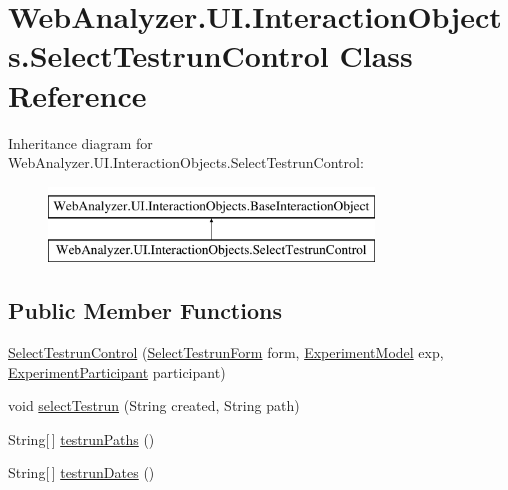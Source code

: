 \hypertarget{class_web_analyzer_1_1_u_i_1_1_interaction_objects_1_1_select_testrun_control}{}\section{Web\+Analyzer.\+U\+I.\+Interaction\+Objects.\+Select\+Testrun\+Control Class Reference}
\label{class_web_analyzer_1_1_u_i_1_1_interaction_objects_1_1_select_testrun_control}
Inheritance diagram for Web\+Analyzer.\+U\+I.\+Interaction\+Objects.\+Select\+Testrun\+Control\+:\begin{figure}[H]
\begin{center}
\leavevmode
\includegraphics[height=2.000000cm]{class_web_analyzer_1_1_u_i_1_1_interaction_objects_1_1_select_testrun_control}
\end{center}
\end{figure}
\subsection*{Public Member Functions}
\begin{DoxyCompactItemize}
\item 
\hyperlink{class_web_analyzer_1_1_u_i_1_1_interaction_objects_1_1_select_testrun_control_a4f0dbab279a50962ffdcc3b473e6167e}{Select\+Testrun\+Control} (\hyperlink{class_web_analyzer_1_1_u_i_1_1_select_testrun_form}{Select\+Testrun\+Form} form, \hyperlink{class_web_analyzer_1_1_models_1_1_base_1_1_experiment_model}{Experiment\+Model} exp, \hyperlink{class_web_analyzer_1_1_models_1_1_base_1_1_experiment_participant}{Experiment\+Participant} participant)
\item 
void \hyperlink{class_web_analyzer_1_1_u_i_1_1_interaction_objects_1_1_select_testrun_control_a72bf63ebb3acdce98d5403246ce1c24b}{select\+Testrun} (String created, String path)
\item 
String\mbox{[}$\,$\mbox{]} \hyperlink{class_web_analyzer_1_1_u_i_1_1_interaction_objects_1_1_select_testrun_control_a57e1bd03061ac1ff242ceefd4833f604}{testrun\+Paths} ()
\item 
String\mbox{[}$\,$\mbox{]} \hyperlink{class_web_analyzer_1_1_u_i_1_1_interaction_objects_1_1_select_testrun_control_a56f1dc28ebb3c0894fd8407ccb27a40e}{testrun\+Dates} ()
\end{DoxyCompactItemize}
